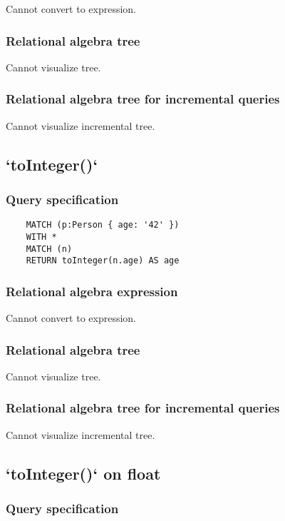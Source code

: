 	Cannot convert to expression.

	\subsubsection*{Relational algebra tree}

	Cannot visualize tree.

	\subsubsection*{Relational algebra tree for incremental queries}

	Cannot visualize incremental tree.
	\subsection{`toInteger()`}

	\subsubsection*{Query specification}

	\begin{lstlisting}
	MATCH (p:Person { age: '42' })
	WITH *
	MATCH (n)
	RETURN toInteger(n.age) AS age
	\end{lstlisting}


	\subsubsection*{Relational algebra expression}

	Cannot convert to expression.

	\subsubsection*{Relational algebra tree}

	Cannot visualize tree.

	\subsubsection*{Relational algebra tree for incremental queries}

	Cannot visualize incremental tree.
	\subsection{`toInteger()` on float}

	\subsubsection*{Query specification}

